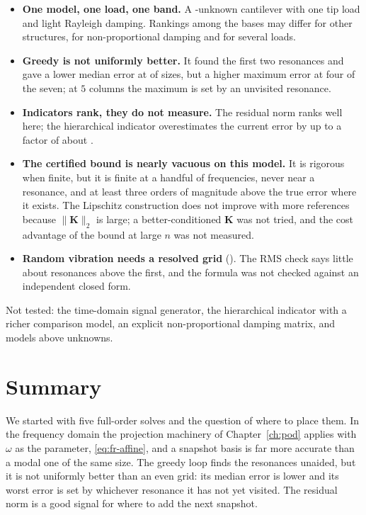 \begin{limitsbox}
\begin{itemize}
\item \textbf{One model, one load, one band.} A \cfrNFree{}-unknown cantilever with one tip load and light Rayleigh damping. Rankings among the bases may differ for other structures, for non-proportional damping and for several loads.
\item \textbf{Greedy is not uniformly better.} It found the first two resonances and gave a lower median error at \cfrGreedyWinsMed{} of \cfrRankCount{} sizes, but a higher maximum error at four of the seven; at $5$ columns the maximum is set by an unvisited resonance.
\item \textbf{Indicators rank, they do not measure.} The residual norm ranks well here; the hierarchical indicator overestimates the current error by up to a factor of about \cfrHierOverMax{}.
\item \textbf{The certified bound is nearly vacuous on this model.} It is rigorous when finite, but it is finite at a handful of frequencies, never near a resonance, and at least three orders of magnitude above the true error where it exists. The Lipschitz construction does not improve with more references because $\|\bm K\|_2$ is large; a better-conditioned $\bm K$ was not tried, and the cost advantage of the bound at large $n$ was not measured.
\item \textbf{Random vibration needs a resolved grid} (). The RMS check says little about resonances above the first, and the formula was not checked against an independent closed form.
\end{itemize}
Not tested: the time-domain signal generator, the hierarchical indicator with a richer comparison model, an explicit non-proportional damping matrix, and models above \cfrNFree{} unknowns.
\end{limitsbox}

\section{Summary}\label{sec:fr-summary}

We started with five full-order solves and the question of where to place them. In the frequency domain the projection machinery of Chapter~\ref{ch:pod} applies with $\omega$ as the parameter, \eqref{eq:fr-affine}, and a snapshot basis is far more accurate than a modal one of the same size. The greedy loop finds the resonances unaided, but it is not uniformly better than an even grid: its median error is lower and its worst error is set by whichever resonance it has not yet visited. The residual norm is a good signal for where to add the next snapshot.

